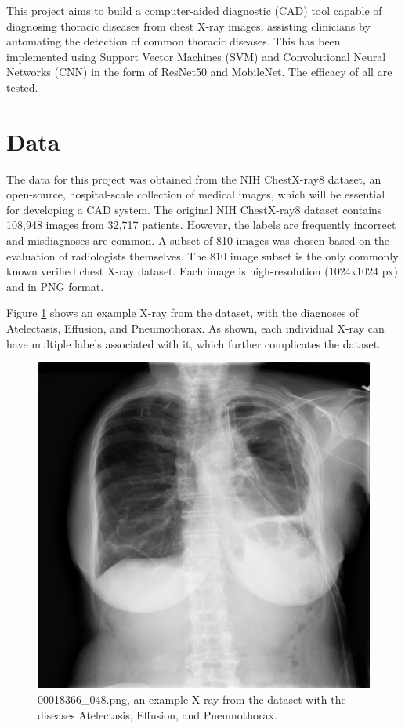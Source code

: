 \documentclass{article}
\theoremstyle{plain}
\theoremstyle{definition}
\theoremstyle{remark}
\begin{document}
This project aims to build a computer-aided diagnostic (CAD) tool capable of diagnosing thoracic
diseases from chest X-ray images, assisting clinicians by automating the detection of common thoracic
diseases. This has been implemented using Support Vector Machines (SVM) and Convolutional Neural Networks
(CNN) in the form of ResNet50 and MobileNet. The efficacy of all are tested.


\section{Data}
The data for this project was obtained from the NIH ChestX-ray8 dataset, an open-source,
hospital-scale collection of medical images, which will be essential for developing a CAD system.
The original NIH ChestX-ray8 dataset contains 108,948 images from 32,717 patients. However, the
labels are frequently incorrect and misdiagnoses are common.
A subset of 810 images was chosen based on the evaluation of radiologists themselves. The 810 image
subset is the only commonly known verified chest X-ray dataset. Each image is high-resolution
(1024x1024 px) and in PNG format.

Figure \ref{fig:examplexray} shows an example X-ray from the dataset, with the diagnoses of
Atelectasis, Effusion, and Pneumothorax. As shown, each individual X-ray can have multiple labels
associated with it, which further complicates the dataset.

\begin{figure}[!h]
    \centering
    \includegraphics[scale=0.5]{00018366_048}
    \caption{00018366\_048.png, an example X-ray from the dataset with the diseases Atelectasis,
    Effusion, and Pneumothorax.}
    \label{fig:examplexray}
\end{figure}
\end{document}
